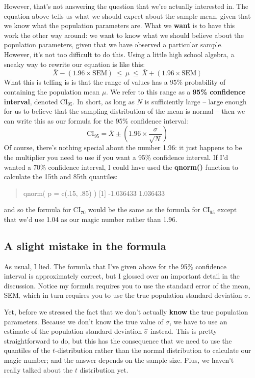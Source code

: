 \documentclass[
]{book}
\begin{document}
However, that's not answering the question that we're actually interested in. The equation above tells us what we should expect about the sample mean, given that we know what the population parameters are. What we \textbf{want} is to have this work the other way around: we want to know what we should believe about the population parameters, given that we have observed a particular sample. However, it's not too difficult to do this. Using a little high school algebra, a sneaky way to rewrite our equation is like this: \[\bar{X} -  \left( 1.96 \times \mbox{SEM} \right) \ \leq \ \mu  \ \leq  \ \bar{X} +  \left( 1.96 \times \mbox{SEM}\right)\] What this is telling is is that the range of values has a 95\% probability of containing the population mean \(\mu\). We refer to this range as a \textbf{95\% confidence interval}, denoted \(\mbox{CI}_{95}\). In short, as long as \(N\) is sufficiently large -- large enough for us to believe that the sampling distribution of the mean is normal -- then we can write this as our formula for the 95\% confidence interval: \[\mbox{CI}_{95} = \bar{X} \pm \left( 1.96 \times \frac{\sigma}{\sqrt{N}} \right)\] Of course, there's nothing special about the number 1.96: it just happens to be the multiplier you need to use if you want a 95\% confidence interval. If I'd wanted a 70\% confidence interval, I could have used the \textbf{qnorm()} function to calculate the 15th and 85th quantiles:

\begin{quote}
qnorm( p = c(.15, .85) ) {[}1{]} -1.036433 1.036433
\end{quote}

and so the formula for \(\mbox{CI}_{70}\) would be the same as the formula for \(\mbox{CI}_{95}\) except that we'd use 1.04 as our magic number rather than 1.96.

\subsection{A slight mistake in the formula}\label{a-slight-mistake-in-the-formula}

As usual, I lied. The formula that I've given above for the 95\% confidence interval is approximately correct, but I glossed over an important detail in the discussion. Notice my formula requires you to use the standard error of the mean, SEM, which in turn requires you to use the true population standard deviation \(\sigma\).

Yet, before we stressed the fact that we don't actually \textbf{know} the true population parameters. Because we don't know the true value of \(\sigma\), we have to use an estimate of the population standard deviation \(\hat{\sigma}\) instead. This is pretty straightforward to do, but this has the consequence that we need to use the quantiles of the \(t\)-distribution rather than the normal distribution to calculate our magic number; and the answer depends on the sample size. Plus, we haven't really talked about the \(t\) distribution yet.
\end{document}
